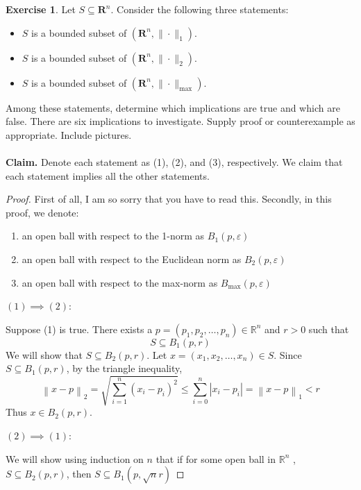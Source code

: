 \documentclass{article}
\newcommand{\R}{\mathbf{R}}
\theoremstyle{plain} %
\numberwithin{thm}{section} %
\theoremstyle{definition}
\newtheorem{exercise}[thm]{Exercise} %
\begin{document}
    \begin{exercise}
        Let $S\subseteq \R^n$. Consider the following three statements:
        \begin{itemize}
            \item $S$ is a bounded subset of $(\R^n,\|\cdot\|_1)$.
            \item $S$ is a bounded subset of $(\R^n,\|\cdot\|_2)$.
            \item $S$ is a bounded subset of $(\R^n,\|\cdot\|_{\max})$.
        \end{itemize}
        Among these statements, determine which implications are true and which are false. There are six implications to investigate. Supply proof or counterexample as appropriate. Include pictures.
        \\\\
        \noindent\textbf{Claim.} Denote each statement as (1), (2), and (3), respectively. We claim that each statement implies all the other statements.
        \begin{proof}
            First of all, I am so sorry that you have to read this. Secondly, in this proof, we denote:
            \begin{enumerate}
                \item an open ball with respect to the 1-norm as \(B_1(p, \varepsilon )\)
                \item an open ball with respect to the Euclidean norm as \(B_2(p, \varepsilon )\) 
                \item an open ball with respect to the max-norm as \(B_{\max} (p, \varepsilon )\)  
            \end{enumerate}
            \((1) \implies (2)\):

            Suppose (1) is true. There exists a \(p = (p_1, p_2, \dots, p_n) \in \mathbb{R}^n\) and \(r > 0\) such that
            \[
                S \subseteq B_1(p, r)
            \] 
            We will show that \(S \subseteq B_2(p, r)\). Let \(x = (x_1, x_2, \dots, x_n) \in S\). Since \(S \subseteq B_1(p, r)\), by the triangle inequality,
            \[
                \left\lVert x - p \right\rVert _2 = \sqrt{\sum_{i=1}^{n} (x_i - p_i)^2} \leq \sum_{i=0}^n \left\vert x_i - p_i \right\vert  = \left\lVert x - p \right\rVert _1 < r
            \]
            Thus \(x \in B_2(p, r)\).

            \noindent\((2) \implies (1)\):
            
            We will show using induction on \(n\) that if for some open ball in \(\mathbb{R} ^n\) , \(S \subseteq B_2(p, r)\),  then \(S \subseteq B_1(p, \sqrt{n} r )\) 


\end{proof}
\end{exercise}
\end{document}
